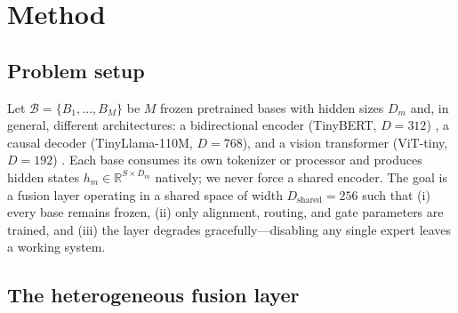 \documentclass[10pt,twoside]{article}
\newcommand{\R}{\mathbb{R}}
\theoremstyle{definition}
\begin{document}
\section{Method}
\label{sec:method}

\subsection{Problem setup}
\label{sec:setup}

Let $\mathcal{B} = \{B_1, \dots, B_M\}$ be $M$ frozen pretrained bases with hidden sizes $D_m$ and, in general, different architectures: a bidirectional encoder (TinyBERT, $D{=}312$) \citep{jiao2020,devlin2019}, a causal decoder (TinyLlama-110M, $D{=}768$), and a vision transformer (ViT-tiny, $D{=}192$) \citep{dosovitskiy2021}. Each base consumes its own tokenizer or processor and produces hidden states $h_m \in \R^{S \times D_m}$ natively; we never force a shared encoder. The goal is a fusion layer operating in a shared space of width $D_{\text{shared}} = 256$ such that (i) every base remains frozen, (ii) only alignment, routing, and gate parameters are trained, and (iii) the layer degrades gracefully---disabling any single expert leaves a working system.

\subsection{The heterogeneous fusion layer}
\label{sec:layer}
\end{document}
